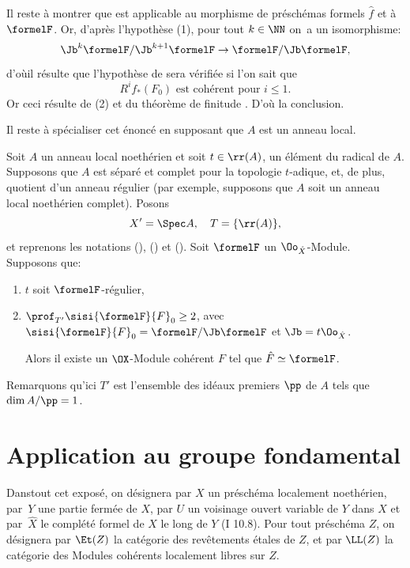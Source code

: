 Il reste \`a montrer que  est applicable au morphisme de pr\'esch\'emas formels $\hat{f}$ et \`a $\formelF$. Or, d'apr\`es l'hypoth\`ese (1), pour tout $k\in \NN$ on~a un isomorphisme:
\begin{equation*} {\Jb}^k \formelF /{\Jb}^{k+1}\formelF \to \formelF / {\Jb} \formelF,
\end{equation*}
d'o\`u\pageoriginaled il r\'esulte que l'hypoth\`ese de  sera v\'erifi\'ee si l'on sait que
\[
R^if_*(F_0)\text{ est coh\'erent pour }i \leq 1.
\]
Or ceci r\'esulte de (2) et du th\'eor\`eme de finitude . D'o\`u la conclusion.

Il reste \`a sp\'ecialiser cet \'enonc\'e en supposant que $A$ est un anneau local.

\begin{corollaire}\setcounter{equation}{8} \label{IX.2.3}
Soit $A$ un anneau local noeth\'erien et soit $t \in \rr(A)$, un \'el\'ement du radical de $A$. Supposons que $A$ est s\'epar\'e et complet pour la topologie $t$-adique, et, de plus, quotient d'un anneau r\'egulier (par exemple, supposons que $A$ soit un anneau local noeth\'erien complet). Posons
\begin{equation} \label{eq:IX.2.9} X'=\Spec A, \quad T = \{ \rr(A) \},
\end{equation}
et reprenons les notations (), () et (). Soit $\formelF$ un $\Oo_{\hat{X}}$-Module. Supposons que:
\begin{enumerate}
\item
$t$ soit $\formelF$-r\'egulier,
\item
$\prof_{T'} \sisi{\formelF}{F}_0 \geq 2$, avec $\sisi{\formelF}{F}_0=\formelF/{\Jb}\formelF$ et ${\Jb}=t\Oo_{\hat{X}}$.

Alors il existe un $\OX$-Module coh\'erent $F$ tel que $\hat{F}\simeq \formelF$.
\end{enumerate}
\end{corollaire}

Remarquons qu'ici $T'$ est l'ensemble des id\'eaux premiers $\pp$ de $A$ tels que \hbox{$\dim A/\pp =1$}.


\chapter{Application au groupe fondamental} \label{X}

\renewcommand{\theequation}{\arabic{equation}}

Dans\pageoriginale tout cet expos\'e, on d\'esignera par $X$ un pr\'esch\'ema localement noeth\'erien, par~$Y$ une partie ferm\'ee de $X$, par $U$ un voisinage ouvert variable de $Y$ dans $X$ et par~$\hat{X}$ le compl\'et\'e formel de $X$ le long de $Y$ (\EGA I 10.8). Pour tout pr\'esch\'ema $Z$, on d\'esignera par $\Et(Z)$ la cat\'egorie des rev\^etements \'etales de $Z$, et par $\LL(Z)$\label{pX.1} la cat\'egorie des Modules coh\'erents localement libres sur $Z$.

